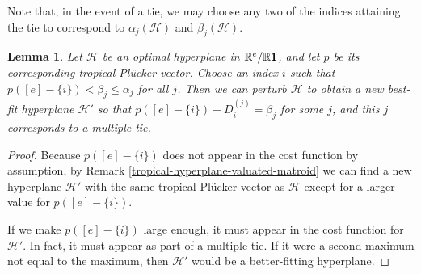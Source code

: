 \documentclass[12pt]{extarticle}
\numberwithin{theorem}{section}
\newtheorem{lemma}[theorem]{Lemma}
\newcommand{\RR}{\mathbb{R}}
\begin{document}
Note that, in the event of a tie, we may choose any two of the indices attaining the tie to correspond to $\alpha_j(\mathcal H)$ and $\beta_j(\mathcal H)$.

\begin{lemma}
Let $\mathcal H$ be an optimal hyperplane in $\RR^e/\RR {\bf 1}$, and let $p$
be its corresponding tropical Pl\"ucker vector. Choose an index $i$ such that $p({[e]-\{i\}})<\beta_j\leq \alpha_j$ for all $j$. Then we can perturb $\mathcal H$ to obtain a new best-fit hyperplane $\mathcal H'$ so that $p([e]-\{i\})+D_i^{(j)}=\beta_j$ for some $j$, and this $j$ corresponds to a multiple tie.
\label{hyperplane-perturbation}
\end{lemma}
\begin{proof}
Because $p({[e] - \{i\}})$ does not appear in the cost function by
assumption, by Remark \ref{tropical-hyperplane-valuated-matroid} we
can find a new hyperplane $\mathcal H'$ with the same tropical Pl\"ucker vector as $\mathcal H$ except for a larger value for $p({[e] - \{i\}})$. 

If we make $p({[e] - \{i\}})$ large enough, it must appear in the cost function for $\mathcal H'$. In fact, it must appear as part of a multiple tie. If it were a second maximum not equal to the maximum, then $\mathcal H'$ would be a better-fitting hyperplane.
\end{proof}
\end{document}
